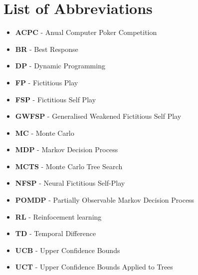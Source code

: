 \pagebreak

\section*{List of Abbreviations}\label{sec:listOfAbbreviations}

\begin{itemize}
    \item \textbf{ACPC} - Anual Computer Poker Competition
    \item \textbf{BR} - Best Response
    \item \textbf{DP} - Dynamic Programming
    \item \textbf{FP} - Fictitious Play
    \item \textbf{FSP} - Fictitious Self Play
    \item \textbf{GWFSP} - Generalised Weakened Fictitious Self Play
    \item \textbf{MC} - Monte Carlo
    \item \textbf{MDP} - Markov Decision Process
    \item \textbf{MCTS} - Monte Carlo Tree Search
    \item \textbf{NFSP} - Neural Fictitious Self-Play
    \item \textbf{POMDP} - Partially Observable Markov Decision Process
    \item \textbf{RL} - Reinfocement learning
    \item \textbf{TD} - Temporal Difference
    \item \textbf{UCB} - Upper Confidence Bounds
    \item \textbf{UCT} - Upper Confidence Bounds Applied to Trees
\end{itemize}
